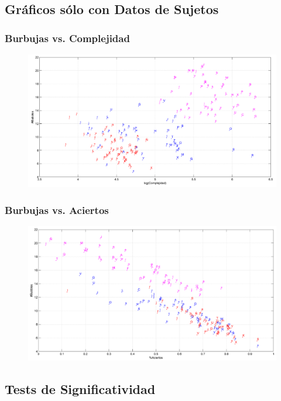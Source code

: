 \documentclass[10pt]{beamer}
\begin{document}
    \subsection{Gr\'aficos s\'olo con Datos de Sujetos}
 	\begin{frame}
	\frametitle{Burbujas vs. Complejidad}
	    \begin{figure}
		\includegraphics[width=\textwidth]{graficos/bubblesVsLogComplejidad_Todos.png}
	    \end{figure}
	\end{frame}

 	\begin{frame}
	\frametitle{Burbujas vs. Aciertos}
	    \begin{figure}
		\includegraphics[width=\textwidth]{graficos/bubblesVsAciertos_Todos.png}
	    \end{figure}
	\end{frame}

    \subsection{Tests de Significatividad}
\end{document}
